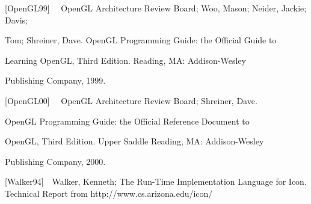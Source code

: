\documentclass[letterpaper]{article}
\begin{document}
\bigskip

{
[OpenGL99] \ \ OpenGL Architecture Review Board; Woo, Mason; Neider, Jackie; Davis;}

{
Tom; Shreiner, Dave. OpenGL Programming Guide: the Official Guide to }

{
Learning OpenGL, Third Edition. Reading, MA: Addison-Wesley }

{
Publishing Company, 1999.}


\bigskip

{
[OpenGL00] \ \ OpenGL Architecture Review Board; Shreiner, Dave.}

{
OpenGL Programming Guide: the Official Reference Document to }

{
OpenGL, Third Edition. Upper Saddle Reading, MA: Addison-Wesley }

{
Publishing Company, 2000.}


\bigskip

{
[Walker94]\ \ Walker, Kenneth; The Run-Time Implementation Language for Icon. Technical Report from
http://www.cs.arizona.edu/icon/}
\end{document}
